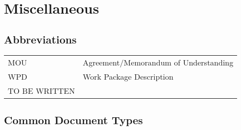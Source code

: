 \chapter{Miscellaneous}


\section{Abbreviations}

\begin{tabular}{l l}
MOU & Agreement/Memorandum of Understanding \\
WPD & Work Package Description \\
TO BE WRITTEN
\end{tabular}


\section{Common Document Types}
\label{sec:Common Document Types}

